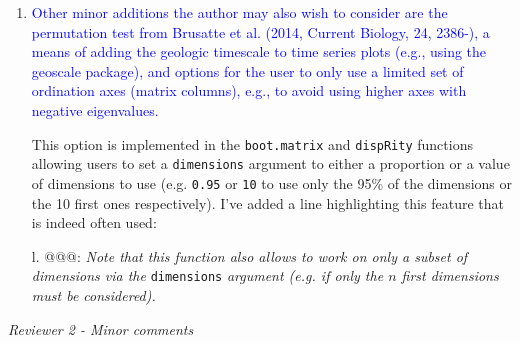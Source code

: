 \documentclass[12pt,letterpaper]{article}
\renewcommand{\subsection}[1]{%
\bigskip
\begin{center}
\begin{large}
\normalfont\itshape #1
\end{large}
\end{center}}
\begin{document}
\begin{enumerate}

\item{\textcolor{blue}{Other minor additions the author may also wish to consider are the permutation test from Brusatte et al. (2014, Current Biology, 24, 2386-), a means of adding the geologic timescale to time series plots (e.g., using the geoscale package), and options for the user to only use a limited set of ordination axes (matrix columns), e.g., to avoid using higher axes with negative eigenvalues.}}

This option is implemented in the \texttt{boot.matrix} and \texttt{dispRity} functions allowing users to set a \texttt{dimensions} argument to either a proportion or a value of dimensions to use (e.g. \texttt{0.95} or \texttt{10} to use only the 95\% of the dimensions or the 10 first ones respectively). I've added a line highlighting this feature that is indeed often used:

l. @@@: \textit{Note that this function also allows to work on only a subset of dimensions via the} \texttt{dimensions} \textit{argument (e.g. if only the $n$ first dimensions must be considered).}

\end{enumerate}

\subsection{Reviewer 2 - Minor comments}
\end{document}
